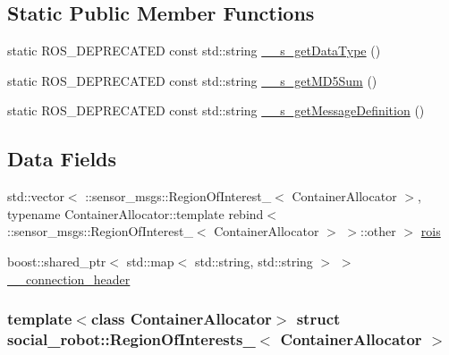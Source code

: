\subsection*{Static Public Member Functions}
\begin{DoxyCompactItemize}
\item 
static ROS\_\-DEPRECATED const std::string \hyperlink{structsocial__robot_1_1RegionOfInterests___a2bf98d6bff2a0639be818a1152f7fb0c}{\_\-\_\-s\_\-getDataType} ()
\item 
static ROS\_\-DEPRECATED const std::string \hyperlink{structsocial__robot_1_1RegionOfInterests___a88f97dd9f5406ecc4a72ea3d2e5db996}{\_\-\_\-s\_\-getMD5Sum} ()
\item 
static ROS\_\-DEPRECATED const std::string \hyperlink{structsocial__robot_1_1RegionOfInterests___a9d788090d90f2322c9b7654e319bfe40}{\_\-\_\-s\_\-getMessageDefinition} ()
\end{DoxyCompactItemize}
\subsection*{Data Fields}
\begin{DoxyCompactItemize}
\item 
std::vector$<$ ::sensor\_\-msgs::RegionOfInterest\_\-$<$ ContainerAllocator $>$, typename ContainerAllocator::template rebind$<$ ::sensor\_\-msgs::RegionOfInterest\_\-$<$ ContainerAllocator $>$ $>$::other $>$ \hyperlink{structsocial__robot_1_1RegionOfInterests___a0881ddf8626d1d5a416448aabb5651bc}{rois}
\item 
boost::shared\_\-ptr$<$ std::map$<$ std::string, std::string $>$ $>$ \hyperlink{structsocial__robot_1_1RegionOfInterests___a6db3b3241debb769e8fabcc70f942f62}{\_\-\_\-connection\_\-header}
\end{DoxyCompactItemize}
\subsubsection*{template$<$class ContainerAllocator$>$ struct social\_\-robot::RegionOfInterests\_\-$<$ ContainerAllocator $>$}



